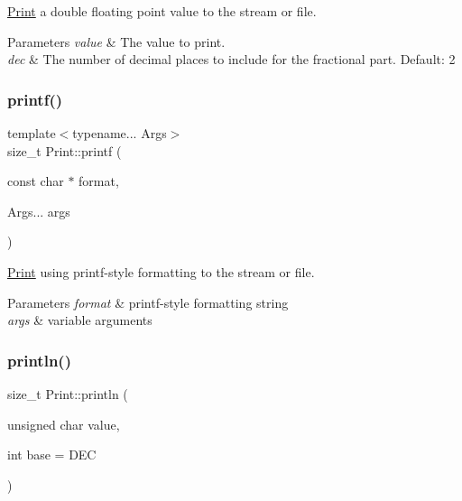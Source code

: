 \mbox{\hyperlink{class_print}{Print}} a double floating point value to the stream or file. 


\begin{DoxyParams}{Parameters}
{\em value} & The value to print. \\
\hline
{\em dec} & The number of decimal places to include for the fractional part. Default\+: 2 \\
\hline
\end{DoxyParams}
\mbox{\label{class_print_a08a461c9fee5fd8f5795d6e9f61e3d5b}} 
\subsubsection{\texorpdfstring{printf()}{printf()}}
{\footnotesize\ttfamily template$<$typename... Args$>$ \\
size\+\_\+t Print\+::printf (\begin{DoxyParamCaption}\item[{const char $\ast$}]{format,  }\item[{Args...}]{args }\end{DoxyParamCaption})\hspace{0.3cm}{\ttfamily [inline]}}



\mbox{\hyperlink{class_print}{Print}} using printf-\/style formatting to the stream or file. 


\begin{DoxyParams}{Parameters}
{\em format} & printf-\/style formatting string\\
\hline
{\em args} & variable arguments \\
\hline
\end{DoxyParams}
\mbox{\label{class_print_a000b3fd5b723cb6c7db0d3231a9ef2f8}} 
\subsubsection{\texorpdfstring{println()}{println()}\hspace{0.1cm}{\footnotesize\ttfamily [1/6]}}
{\footnotesize\ttfamily size\+\_\+t Print\+::println (\begin{DoxyParamCaption}\item[{unsigned char}]{value,  }\item[{int}]{base = {\ttfamily DEC} }\end{DoxyParamCaption})}



